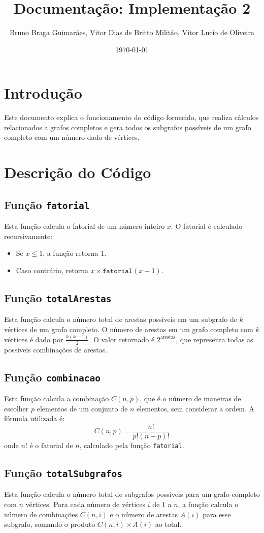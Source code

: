 \documentclass{article}
\title{Documentação: Implementação 2}
\author{Bruno Braga Guimarães, Vitor Dias de Britto Militão, Vitor Lucio de Oliveira}
\date{\today}
\begin{document}
\maketitle

\section{Introdução}
Este documento explica o funcionamento do código fornecido, que realiza cálculos relacionados a grafos completos e gera todos os subgrafos possíveis de um grafo completo com um número dado de vértices.

\section{Descrição do Código}

\subsection{Função \texttt{fatorial}}
Esta função calcula o fatorial de um número inteiro \(x\). O fatorial é calculado recursivamente:
\begin{itemize}
    \item Se \(x \leq 1\), a função retorna 1.
    \item Caso contrário, retorna \(x \times \texttt{fatorial}(x-1)\).
\end{itemize}

\subsection{Função \texttt{totalArestas}}
Esta função calcula o número total de arestas possíveis em um subgrafo de \(k\) vértices de um grafo completo. O número de arestas em um grafo completo com \(k\) vértices é dado por \(\frac{k(k-1)}{2}\). O valor retornado é \(2^{\text{arestas}}\), que representa todas as possíveis combinações de arestas.

\subsection{Função \texttt{combinacao}}
Esta função calcula a combinação \(C(n, p)\), que é o número de maneiras de escolher \(p\) elementos de um conjunto de \(n\) elementos, sem considerar a ordem. A fórmula utilizada é:
\[
C(n, p) = \frac{n!}{p!(n-p)!}
\]
onde \(n!\) é o fatorial de \(n\), calculado pela função \texttt{fatorial}.

\subsection{Função \texttt{totalSubgrafos}}
Esta função calcula o número total de subgrafos possíveis para um grafo completo com \(n\) vértices. Para cada número de vértices \(i\) de 1 a \(n\), a função calcula o número de combinações \(C(n, i)\) e o número de arestas \(A(i)\) para esse subgrafo, somando o produto \(C(n, i) \times A(i)\) ao total.
\end{document}
